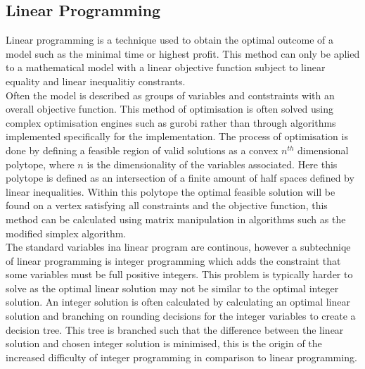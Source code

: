 \subsection{Linear Programming}
Linear programming is a technique used to obtain the optimal outcome of a model such as the minimal time or highest profit. This method can only be aplied to a mathematical model with a linear objective function subject to linear equality and linear inequalitiy constrants.\\ Often the model is described as groups of variables and contstraints with an overall objective function. This method of optimisation is often solved using complex optimisation engines such as gurobi rather than through algorithms implemented specifically for the implementation. The process of optimisation is done by defining a feasible region of valid solutions as a convex $n^{th}$ dimensional polytope, where $n$ is the dimensionality of the variables associated. Here this polytope is defined as an intersection of a finite amount of half spaces defined by linear inequalities. Within this polytope the optimal feasible solution will be found on a vertex satisfying all constraints and the objective function, this method can be calculated using matrix manipulation in algorithms such as the modified simplex algorithm.  	
\\
The standard variables ina linear program are continous, however a subtechniqe of linear programming is integer programming which adds the constraint that some variables must be full positive integers. This problem is typically harder to solve as the optimal linear solution may not be similar to the optimal integer solution. An integer solution is often calculated by calculating an optimal linear solution and branching on rounding decisions for the integer variables to create a decision tree. This tree is branched such that the difference between the linear solution and chosen integer solution is minimised, this is the origin of the increased difficulty of integer programming in comparison to linear programming. 

